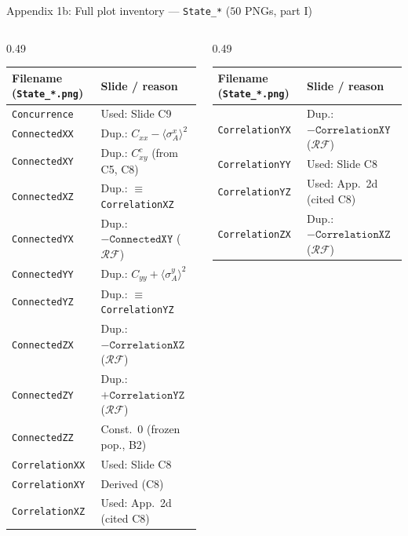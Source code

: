 \documentclass[aspectratio=169,11pt]{beamer}
\begin{document}
\begin{frame}{Appendix 1b: Full plot inventory --- \texttt{State\_*} ($50$ PNGs, part I)}
\scriptsize\setlength{\tabcolsep}{3pt}
\begin{columns}[T,totalwidth=\textwidth]
\begin{column}{0.49\textwidth}
\begin{tabular}{@{}ll@{}}
\toprule
Filename (\texttt{State\_*.png}) & Slide / reason \\\midrule
\texttt{Concurrence} & Used: Slide C9 \\
\texttt{ConnectedXX} & Dup.: $C_{xx}-\langle\sigma_A^x\rangle^2$ \\
\texttt{ConnectedXY} & Dup.: $C_{xy}^c$ (from C5, C8) \\
\texttt{ConnectedXZ} & Dup.: $\equiv$ \texttt{CorrelationXZ} \\
\texttt{ConnectedYX} & Dup.: $-\texttt{ConnectedXY}$ ($\mathcal R\mathcal F$) \\
\texttt{ConnectedYY} & Dup.: $C_{yy}+\langle\sigma_A^y\rangle^2$ \\
\texttt{ConnectedYZ} & Dup.: $\equiv$ \texttt{CorrelationYZ} \\
\texttt{ConnectedZX} & Dup.: $-\texttt{CorrelationXZ}$ ($\mathcal R\mathcal F$) \\
\texttt{ConnectedZY} & Dup.: $+\texttt{CorrelationYZ}$ ($\mathcal R\mathcal F$) \\
\texttt{ConnectedZZ} & Const.\ $0$ (frozen pop., B2) \\
\texttt{CorrelationXX} & Used: Slide C8 \\
\texttt{CorrelationXY} & Derived (C8) \\
\texttt{CorrelationXZ} & Used: App.\ 2d (cited C8) \\\bottomrule
\end{tabular}
\end{column}
\begin{column}{0.49\textwidth}
\begin{tabular}{@{}ll@{}}
\toprule
Filename (\texttt{State\_*.png}) & Slide / reason \\\midrule
\texttt{CorrelationYX} & Dup.: $-\texttt{CorrelationXY}$ ($\mathcal R\mathcal F$) \\
\texttt{CorrelationYY} & Used: Slide C8 \\
\texttt{CorrelationYZ} & Used: App.\ 2d (cited C8) \\
\texttt{CorrelationZX} & Dup.: $-\texttt{CorrelationXZ}$ ($\mathcal R\mathcal F$) \\

\end{tabular}
\end{column}
\end{columns}
\end{frame}
\end{document}
